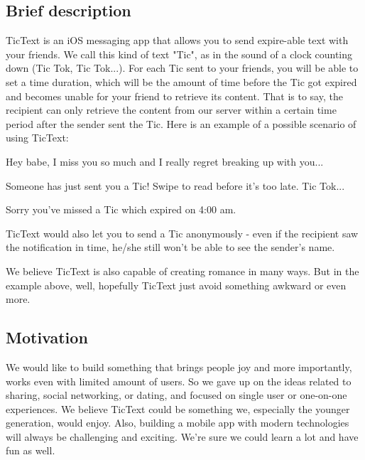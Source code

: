 \subsection{Brief description}
TicText is an iOS messaging app that allows you to send expire-able text with your friends. We call this kind of text "Tic", as in the sound of a clock counting down (Tic Tok, Tic Tok...). For each Tic sent to your friends, you will be able to set a time duration, which will be the amount of time before the Tic got expired and becomes unable for your friend to retrieve its content. That is to say, the recipient can only retrieve the content from our server within a certain time period after the sender sent the Tic. Here is an example of a possible scenario of using TicText:

\begin{dialogue}
	 
	
		\medskip
		Hey babe, I miss you so much and I really regret breaking up with you...
	
		\medskip
	 Someone has just sent you a Tic! Swipe to read before it's too late. Tic Tok...
	
		\medskip
	 Sorry you've missed a Tic which expired on 4:00 am.
\end{dialogue}

TicText would also let you to send a Tic anonymously - even if the recipient saw the notification in time, he/she still won't be able to see the sender's name.

We believe TicText is also capable of creating romance in many ways. But in the example above, well, hopefully TicText just avoid something awkward or even more. 
\subsection{Motivation}
We would like to build something that brings people joy and more importantly, works even with limited amount of users. So we gave up on the ideas related to sharing, social networking, or dating, and focused on single user or one-on-one experiences. We believe TicText could be something we, especially the younger generation, would enjoy. Also, building a mobile app with modern technologies will always be challenging and exciting. We're sure we could learn a lot and have fun as well. 

